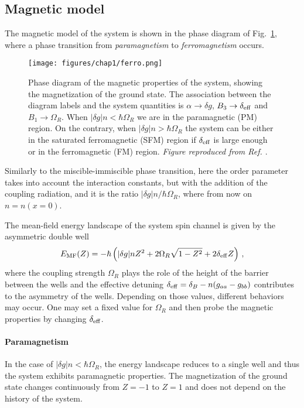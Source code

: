 \subsection{Magnetic model}
The magnetic model of the system is shown in the phase diagram of Fig.\ \ref{fig:ferro}, where a phase transition from \textit{paramagnetism} to \textit{ferromagnetism} occurs.
\begin{figure}[ht!]
    \centering
    \texttt{[image: figures/chap1/ferro.png]}
    \caption{Phase diagram of the magnetic properties of the system, showing the magnetization of the ground state. The association between the diagram labels and the system quantities is $\alpha\to \delta g$, $B_3 \to \delta_{\rm eff}$ and $B_1 \to \Omega_R$. When $|\delta g|n < \hbar\Omega_R$ we are in the paramagnetic (PM) region. On the contrary, when $|\delta g|n > \hbar\Omega_R$ the system can be either in the saturated ferromagnetic (SFM) region if $\delta_{\rm eff}$ is large enough or in the ferromagnetic (FM) region. \textit{Figure reproduced from Ref. \cite{cominotti2023ferro}}.}
    \label{fig:ferro}
\end{figure}
Similarly to the miscible-immiscible phase transition, here the order parameter takes into account the interaction constants, but with the addition of the coupling radiation, and it is the ratio $|\delta g|n/\hbar\Omega_R$, where from now on $n = n(x = 0)$.

The mean-field energy landscape of the system spin channel is given by the asymmetric double well
\begin{equation}
    E_{\rm MF}(Z) = -\hbar\left(|\delta g|n Z^2 + 2\Omega_R \sqrt{1-Z^2} + 2\delta_{\rm eff} Z\right)\, ,
    \label{eq:E_MF}
\end{equation}
where the coupling strength $\Omega_R$ plays the role of the height of the barrier between the wells and the effective detuning $\delta_{\rm eff} = \delta_B - n(g_{aa}-g_{bb})$ contributes to the asymmetry of the wells. Depending on those values, different behaviors may occur. One may set a fixed value for $\Omega_R$ and then probe the magnetic properties by changing $\delta_{\rm eff}$.

\paragraph{Paramagnetism}
In the case of $|\delta g|n < \hbar\Omega_R$, the energy landscape reduces to a single well and thus the system exhibits paramagnetic properties. The magnetization of the ground state changes continuously from $Z=-1$ to $Z=1$ and does not depend on the history of the system. 

